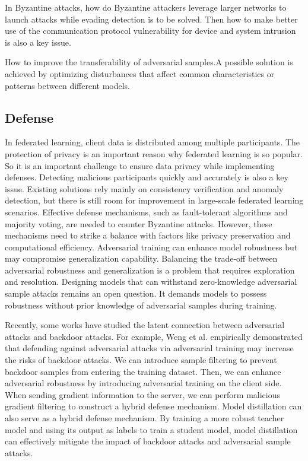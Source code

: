 \documentclass[conference]{IEEEtran}
\begin{document}
In Byzantine attacks,  how do Byzantine attackers leverage larger networks to launch attacks while evading detection is to be solved.  
Then how to make better use of the communication protocol vulnerability for device and system intrusion is also a key issue.

How to improve the transferability of adversarial samples.A possible solution is achieved by optimizing disturbances that affect common characteristics or patterns between different models.

\subsection{Defense}
In federated learning, client data is distributed among multiple participants. The protection of privacy is an important reason why federated learning is so popular. So it is an important challenge to ensure data privacy while implementing defenses.  
Detecting malicious participants quickly and accurately is also a key issue. Existing solutions rely mainly on consistency verification and anomaly detection, but there is still room for improvement in large-scale federated learning scenarios.  
Effective defense mechanisms, such as fault-tolerant algorithms and majority voting, are needed to counter Byzantine attacks. However, these mechanisms need to strike a balance with factors like privacy preservation and computational efficiency.
Adversarial training can enhance model robustness but may compromise generalization capability. Balancing the trade-off between adversarial robustness and generalization is a problem that requires exploration and resolution.
Designing models that can withstand zero-knowledge adversarial sample attacks remains an open question. It demands models to possess robustness without prior knowledge of adversarial samples during training.

Recently, some works have studied the latent connection between adversarial attacks and backdoor attacks.
For example, Weng et al. \cite{b66}empirically demonstrated that defending
against adversarial attacks via adversarial training may increase the risks of backdoor attacks.
We can introduce sample filtering to prevent backdoor samples from entering the training dataset. 
Then, we can enhance adversarial robustness by introducing adversarial training on the client side. 
When sending gradient information to the server, we can perform malicious gradient filtering to construct a hybrid defense mechanism.
Model distillation can also serve as a hybrid defense mechanism. 
By training a more robust teacher model and using its output as labels to train a student model, 
model distillation can effectively mitigate the impact of backdoor attacks and adversarial sample attacks.
\end{document}
